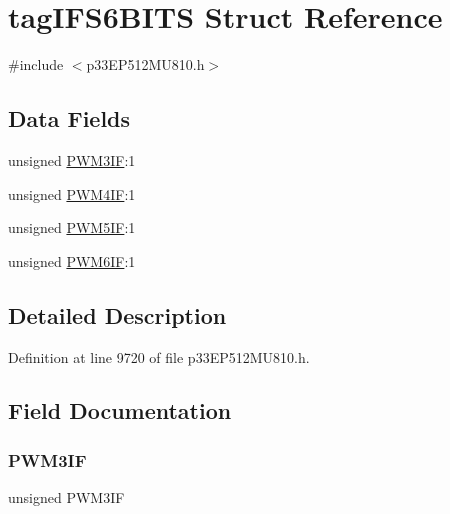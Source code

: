 \hypertarget{structtag_i_f_s6_b_i_t_s}{}\section{tag\+I\+F\+S6\+B\+I\+TS Struct Reference}
\label{structtag_i_f_s6_b_i_t_s}


{\ttfamily \#include $<$p33\+E\+P512\+M\+U810.\+h$>$}

\subsection*{Data Fields}
\begin{DoxyCompactItemize}
\item 
unsigned \hyperlink{structtag_i_f_s6_b_i_t_s_ae44844637b9ac0621ced38487bf05724}{P\+W\+M3\+IF}\+:1
\item 
unsigned \hyperlink{structtag_i_f_s6_b_i_t_s_a83efaaa306f3090127a9c3e179863fd6}{P\+W\+M4\+IF}\+:1
\item 
unsigned \hyperlink{structtag_i_f_s6_b_i_t_s_a06e63b53352db7e390f6c2fda5340eb2}{P\+W\+M5\+IF}\+:1
\item 
unsigned \hyperlink{structtag_i_f_s6_b_i_t_s_a12e009af41dbbeb71fc73d842bd93489}{P\+W\+M6\+IF}\+:1
\end{DoxyCompactItemize}


\subsection{Detailed Description}


Definition at line 9720 of file p33\+E\+P512\+M\+U810.\+h.



\subsection{Field Documentation}
\mbox{\label{structtag_i_f_s6_b_i_t_s_ae44844637b9ac0621ced38487bf05724}} 
\subsubsection{\texorpdfstring{P\+W\+M3\+IF}{PWM3IF}}
{\footnotesize\ttfamily unsigned P\+W\+M3\+IF}



